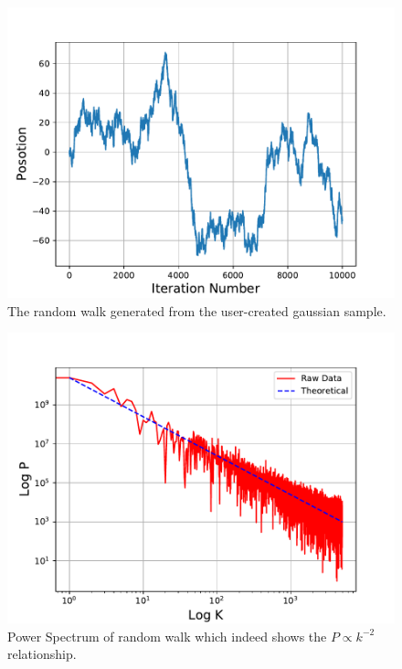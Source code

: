 \documentclass{article}
\begin{document}
\begin{enumerate}
{\begin{figure}
    \end{figure}
    \begin{figure}
        \centering
        \includegraphics{random_walk.pdf}
        \caption{The random walk generated from the user-created gaussian sample.}
        \label{fig:my_label}
    \end{figure}
    \begin{figure}
        \centering
        \includegraphics{power_spec_walk.pdf}
        \caption{Power Spectrum of random walk which indeed shows the $P \propto k^{-2}$ relationship.}
        \label{fig:my_label}
    \end{figure}
    }
\end{enumerate}
\end{document}
